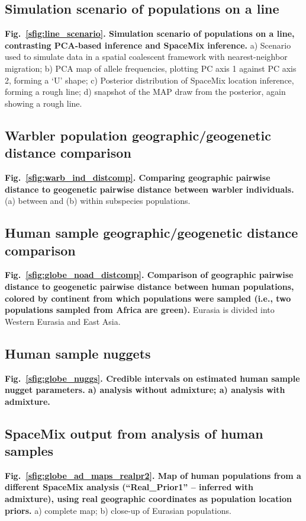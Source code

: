 \documentclass[10pt,letterpaper]{article}
\begin{document}
\subsection*{Simulation scenario of populations on a line}
\label{line_scenario}
{\bf{Fig.\ \ref{sfig:line_scenario}. Simulation scenario of populations on a line, contrasting PCA-based inference and SpaceMix inference.}} a) Scenario used to simulate data in a spatial coalescent framework with nearest-neighbor migration; b) PCA map of allele frequencies, plotting PC axis 1 against PC axis 2, forming a `U' shape; c) Posterior distribution of SpaceMix location inference, forming a rough line; d) snapshot of the MAP draw from the posterior, again showing a rough line.

\subsection*{Warbler population geographic/geogenetic distance comparison}
\label{warb_ind_distcomp}
{\bf{Fig.\ \ref{sfig:warb_ind_distcomp}. Comparing geographic pairwise distance to geogenetic pairwise distance between warbler individuals.}} 
(a) between and (b) within subspecies populations.

\subsection*{Human sample geographic/geogenetic distance comparison}
\label{globe_noad_distcomp}
{\bf{Fig.\ \ref{sfig:globe_noad_distcomp}. Comparison of geographic pairwise distance to geogenetic pairwise distance between human populations, colored by continent from which populations were sampled (i.e., two populations sampled from Africa are green).}} Eurasia is divided into Western Eurasia and East Asia.

\subsection*{Human sample nuggets}
\label{globe_nuggs}
{\bf{Fig.\ \ref{sfig:globe_nuggs}. Credible intervals on estimated human sample nugget parameters. a) analysis without admixture; a) analysis with admixture.}}

\subsection*{SpaceMix output from analysis of human samples}
\label{globe_ad_maps_realpr2}
{\bf{Fig.\ \ref{sfig:globe_ad_maps_realpr2}. Map of human populations from a different SpaceMix analysis (``Real\_Prior1'' -- inferred with admixture), using real geographic coordinates as population location priors.}} a) complete map; b) close-up of Eurasian populations.
\end{document}
